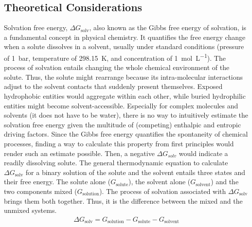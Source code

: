 \documentclass[9pt,tutorial]{livecoms}
\begin{document}
\subsection*{Theoretical Considerations}
Solvation free energy, $\Delta G_\text{solv}$, also known as the Gibbs free energy of solvation, is a fundamental concept in physical chemistry. It quantifies the free energy change when a solute dissolves in a solvent, usually under standard conditions (pressure of \SI{1}{\bar}, temperature of \SI{298.15}{\kelvin}, and concentration of \SI{1}{\mole\per\liter}). 
The process of solvation entails changing the whole chemical environment of the solute. Thus, the solute might rearrange because its intra-molecular interactions adjust to the solvent contacts that suddenly present themselves. Exposed hydrophobic entities would aggregate within each other, while buried hydrophilic entities might become solvent-accessible. Especially for complex molecules and solvents (it does not have to be water), there is no way to intuitively estimate the solvation free energy given the multitude of (competing) enthalpic and entropic driving factors. Since the Gibbs free energy quantifies the spontaneity of chemical processes, finding a way to calculate this property from first principles would render such an estimate possible. Then, a negative $\Delta G_{solv}$ would indicate a readily dissolving solute.
The general thermodynamic equation to calculate $\Delta G_\text{solv}$ for a binary solution of the solute and the solvent entails three states and their free energy. The solute alone ($G_\text{solute}$), the solvent alone ($G_\text{solvent}$) and the two components mixed ($G_\text{solution}$). The process of solvation associated with $\Delta G_\text{solv}$ brings them both together. Thus, it is the difference between the mixed and the unmixed systems.
\begin{align}\label{eq:deltaGsolv}
    \Delta G_\text{solv} = G_\text{solution} - G_\text{solute} - G_\text{solvent}
\end{align}
\end{document}
